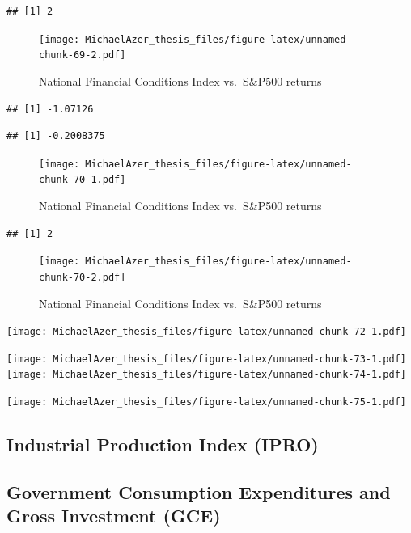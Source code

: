 \documentclass[]{book}
\begin{document}
\begin{verbatim}
## [1] 2
\end{verbatim}

\begin{figure}
\centering
\texttt{[image: MichaelAzer\_thesis\_files/figure-latex/unnamed-chunk-69-2.pdf]}
\caption{\label{fig:unnamed-chunk-69-2}\label{fig:figs}National Financial Conditions Index vs.~S\&P500 returns}
\end{figure}

\begin{verbatim}
## [1] -1.07126
\end{verbatim}

\begin{verbatim}
## [1] -0.2008375
\end{verbatim}

\begin{figure}
\centering
\texttt{[image: MichaelAzer\_thesis\_files/figure-latex/unnamed-chunk-70-1.pdf]}
\caption{\label{fig:unnamed-chunk-70-1}\label{fig:figs}National Financial Conditions Index vs.~S\&P500 returns}
\end{figure}

\begin{verbatim}
## [1] 2
\end{verbatim}

\begin{figure}
\centering
\texttt{[image: MichaelAzer\_thesis\_files/figure-latex/unnamed-chunk-70-2.pdf]}
\caption{\label{fig:unnamed-chunk-70-2}\label{fig:figs}National Financial Conditions Index vs.~S\&P500 returns}
\end{figure}

\texttt{[image: MichaelAzer\_thesis\_files/figure-latex/unnamed-chunk-72-1.pdf]}

\texttt{[image: MichaelAzer\_thesis\_files/figure-latex/unnamed-chunk-73-1.pdf]}
\texttt{[image: MichaelAzer\_thesis\_files/figure-latex/unnamed-chunk-74-1.pdf]}

\texttt{[image: MichaelAzer\_thesis\_files/figure-latex/unnamed-chunk-75-1.pdf]}

\hypertarget{industrial-production-index-ipro}{%
\subsection{Industrial Production Index (IPRO)}\label{industrial-production-index-ipro}}

\hypertarget{government-consumption-expenditures-and-gross-investment-gce}{%
\subsection{Government Consumption Expenditures and Gross Investment (GCE)}\label{government-consumption-expenditures-and-gross-investment-gce}}
\end{document}
